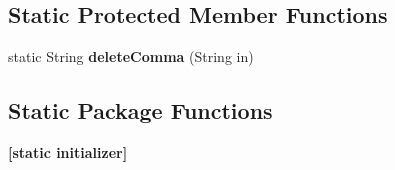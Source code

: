 \subsection*{Static Protected Member Functions}
\begin{DoxyCompactItemize}
\item 
\hypertarget{classcom_1_1bluevia_1_1directory_1_1data_1_1FilterUtils_ae573d80d8f2d18eca2c726a4f3d9fd58}{
static String {\bfseries deleteComma} (String in)}
\label{classcom_1_1bluevia_1_1directory_1_1data_1_1FilterUtils_ae573d80d8f2d18eca2c726a4f3d9fd58}

\end{DoxyCompactItemize}
\subsection*{Static Package Functions}
\begin{DoxyCompactItemize}
\item 
\hypertarget{classcom_1_1bluevia_1_1directory_1_1data_1_1FilterUtils_aa55240d96b6eb97a914fee36eda397d6}{
{\bfseries \mbox{[}static initializer\mbox{]}}}
\label{classcom_1_1bluevia_1_1directory_1_1data_1_1FilterUtils_aa55240d96b6eb97a914fee36eda397d6}

\end{DoxyCompactItemize}
